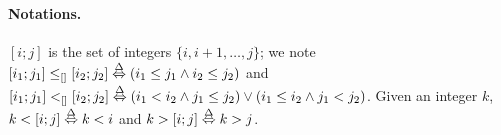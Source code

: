 \paragraph{Notations.}
$[i;j]$ is the set of integers $\{ i, i+1, \dots, j \}$;
we note $[i_1;j_1] \leq_{[]} [i_2;j_2] \stackrel{\Delta}\Leftrightarrow (i_1\leq j_1\wedge i_2\leq j_2)$
and $[i_1;j_1] <_{[]} [i_2;j_2] \stackrel{\Delta}\Leftrightarrow 
(i_1<i_2 \wedge j_1\leq j_2) \vee (i_1\leq i_2\wedge j_1 < j_2)$.
Given an integer $k$, $k<[i;j] \stackrel{\Delta}\Leftrightarrow k <i$ and $k>[i;j]\stackrel{\Delta}\Leftrightarrow k > j$.
